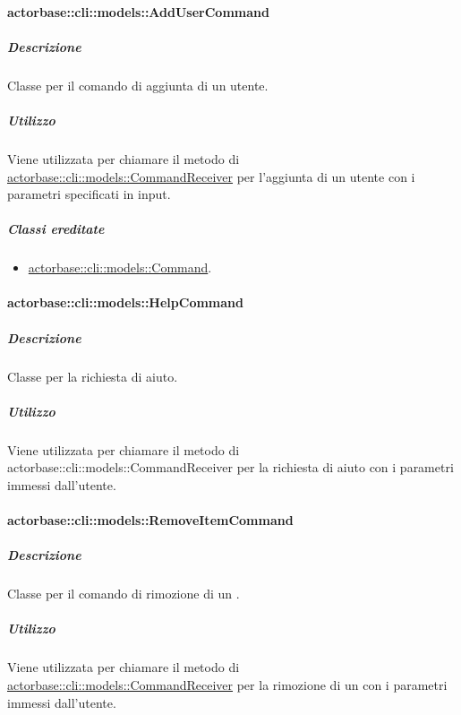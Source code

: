 \documentclass{scalatekids-article}
\begin{document}
\paragraph{actorbase::cli::models::AddUserCommand}
\label{sec:actorbase::cli::models::AddUserCommand}

\subparagraph{Descrizione}

Classe per il comando di aggiunta di un utente.

\subparagraph{Utilizzo}

Viene utilizzata per chiamare il metodo di
\hyperref[sec:actorbase::cli::models::CommandReceiver]{actorbase::cli::models::CommandReceiver} per l'aggiunta di un utente con i
parametri specificati in input.

\subparagraph{Classi ereditate}

\begin{itemize}
\item \hyperref[sec:actorbase::cli::models::Command]{actorbase::cli::models::Command}.
\end{itemize}

\paragraph{actorbase::cli::models::HelpCommand}
\label{sec:actorbase::cli::models::HelpCommand}

\subparagraph{Descrizione}

Classe per la richiesta di aiuto.

\subparagraph{Utilizzo}

Viene utilizzata per chiamare il metodo di
actorbase::cli::models::CommandReceiver per la richiesta di aiuto con i
parametri immessi dall'utente.

\paragraph{actorbase::cli::models::RemoveItemCommand}
\label{sec:actorbase::cli::models::RemoveItemCommand}

\subparagraph{Descrizione}

Classe per il comando di rimozione di un .

\subparagraph{Utilizzo}

Viene utilizzata per chiamare il metodo di
\hyperref[sec:actorbase::cli::models::CommandReceiver]{actorbase::cli::models::CommandReceiver} per la rimozione di un 
con i parametri immessi dall'utente.
\end{document}
